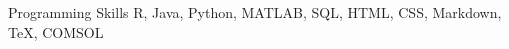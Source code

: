 

\begin{cvskills}



\cvskill
    {Programming Skills} %
    {R, Java, Python, MATLAB, SQL, HTML, CSS, Markdown, TeX, COMSOL} %
    

    


    

\end{cvskills}
